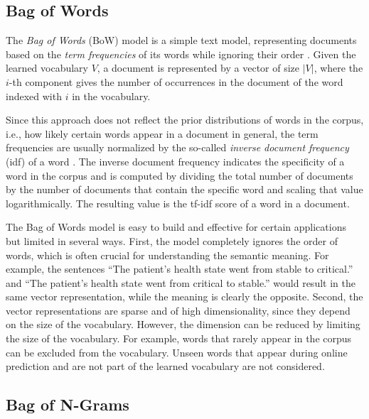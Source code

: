 \subsection{Bag of Words}\label{sec:bow}

The \textit{Bag of Words} (BoW) model is a simple text model, representing documents based on the \textit{term frequencies} of its words while ignoring their order \cite{harris1954distributional}.
Given the learned vocabulary $V$, a document is represented by a vector of size $|V|$, where the $i$-th component gives the number of occurrences in the document of the word indexed with $i$ in the vocabulary.

Since this approach does not reflect the prior distributions of words in the corpus, i.e., how likely certain words appear in a document in general, the term frequencies are usually normalized by the so-called \textit{inverse document frequency} (idf) of a word \cite{DBLP:journals/cacm/SaltonWY75}.
The inverse document frequency indicates the specificity of a word in the corpus and is computed by dividing the total number of documents by the number of documents that contain the specific word and scaling that value logarithmically.
The resulting value is the tf-idf score of a word in a document.

The Bag of Words model is easy to build and effective for certain applications but limited in several ways.
First, the model completely ignores the order of words, which is often crucial for understanding the semantic meaning.
For example, the sentences  \enquote{The patient’s health state went from stable to critical.} and  \enquote{The patient’s health state went from critical to stable.} would result in the same vector representation, while the meaning is clearly the opposite.
Second, the vector representations are sparse and of high dimensionality, since they depend on the size of the vocabulary.
However, the dimension can be reduced by limiting the size of the vocabulary.
For example, words that rarely appear in the corpus can be excluded from the vocabulary.
Unseen words that appear during online prediction and are not part of the learned vocabulary are not considered.

\subsection{Bag of N-Grams}

